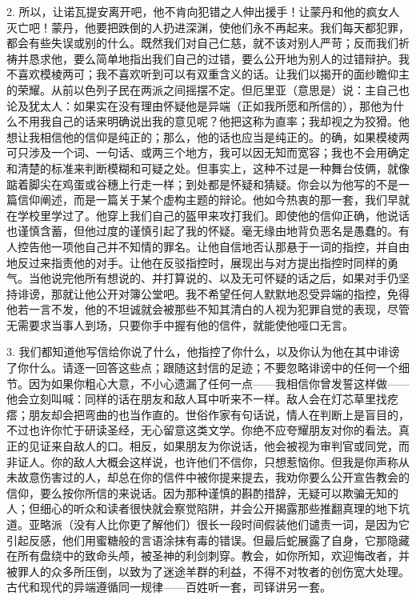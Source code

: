 2. 所以，让诺瓦提安离开吧，他不肯向犯错之人伸出援手！让蒙丹和他的疯女人灭亡吧！蒙丹，他要把跌倒的人扔进深渊，使他们永不再起来。我们每天都犯罪，都会有些失误或别的什么。既然我们对自己仁慈，就不该对别人严苛；反而我们祈祷并恳求他，要么简单地指出我们自己的过错，要么公开地为别人的过错辩护。我不喜欢模棱两可；我不喜欢听到可以有双重含义的话。让我们以揭开的面纱瞻仰主的荣耀。从前以色列子民在两派之间摇摆不定。但厄里亚（意思是）说：主自己也论及犹太人：如果实在没有理由怀疑他是异端（正如我所愿和所信的），那他为什么不用我自己的话来明确说出我的意见呢？他把这称为直率；我却视之为狡猾。他想让我相信他的信仰是纯正的；那么，他的话也应当是纯正的。的确，如果模棱两可只涉及一个词、一句话、或两三个地方，我可以因无知而宽容；我也不会用确定和清楚的标准来判断模糊和可疑之处。但事实上，这种不过是一种舞台伎俩，就像踮着脚尖在鸡蛋或谷穗上行走一样；到处都是怀疑和猜疑。你会以为他写的不是一篇信仰阐述，而是一篇关于某个虚构主题的辩论。他如今热衷的那一套，我们早就在学校里学过了。他穿上我们自己的盔甲来攻打我们。即使他的信仰正确，他说话也谨慎含蓄，但他过度的谨慎引起了我的怀疑。毫无缘由地背负恶名是愚蠢的。有人控告他一项他自己并不知情的罪名。让他自信地否认那悬于一词的指控，并自由地反过来指责他的对手。让他在反驳指控时，展现出与对方提出指控时同样的勇气。当他说完他所有想说的、并打算说的、以及无可怀疑的话之后，如果对手仍坚持诽谤，那就让他公开对簿公堂吧。我不希望任何人默默地忍受异端的指控，免得他若一言不发，他的不坦诚就会被那些不知其清白的人视为犯罪自觉的表现，尽管无需要求当事人到场，只要你手中握有他的信件，就能使他哑口无言。\newline{}\par

3. 我们都知道他写信给你说了什么，他指控了你什么，以及你认为他在其中诽谤了你什么。请逐一回答这些点；跟随这封信的足迹；不要忽略诽谤中的任何一个细节。因为如果你粗心大意，不小心遗漏了任何一点——我相信你曾发誓这样做——他会立刻叫喊：同样的话在朋友和敌人耳中听来不一样。敌人会在灯芯草里找疙瘩；朋友却会把弯曲的也当作直的。世俗作家有句话说，情人在判断上是盲目的，不过也许你忙于研读圣经，无心留意这类文学。你绝不应夸耀朋友对你的看法。真正的见证来自敌人的口。相反，如果朋友为你说话，他会被视为审判官或同党，而非证人。你的敌人大概会这样说，也许他们不信你，只想惹恼你。但我是你声称从未故意伤害过的人，却总在你的信件中被你提来提去，我劝你要么公开宣告教会的信仰，要么按你所信的来说话。因为那种谨慎的斟酌措辞，无疑可以欺骗无知的人；但细心的听众和读者很快就会察觉陷阱，并会公开揭露那些推翻真理的地下坑道。亚略派（没有人比你更了解他们）很长一段时间假装他们谴责一词，是因为它引起反感，他们用蜜糖般的言语涂抹有毒的错误。但最后蛇展露了自身，它那隐藏在所有盘绕中的致命头颅，被圣神的利剑刺穿。教会，如你所知，欢迎悔改者，并被罪人的众多所压倒，以致为了迷途羊群的利益，不得不对牧者的创伤宽大处理。古代和现代的异端遵循同一规律——百姓听一套，司铎讲另一套。\newline{}\par

